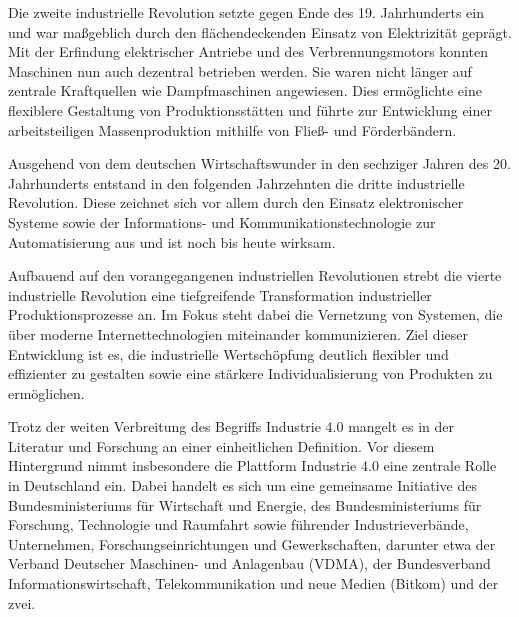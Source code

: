 Die zweite industrielle Revolution setzte gegen Ende des 19. Jahrhunderts ein und war maßgeblich durch den flächendeckenden Einsatz von Elektrizität geprägt. 
Mit der Erfindung elektrischer Antriebe und des Verbrennungsmotors konnten Maschinen nun auch dezentral betrieben werden. Sie waren nicht länger auf zentrale Kraftquellen wie Dampfmaschinen angewiesen. 
Dies ermöglichte eine flexiblere Gestaltung von Produktionsstätten und führte zur Entwicklung einer arbeitsteiligen Massenproduktion mithilfe von Fließ- und Förderbändern.

Ausgehend von dem deutschen Wirtschaftswunder in den sechziger Jahren des 20. Jahrhunderts entstand in den folgenden Jahrzehnten die dritte industrielle Revolution.
Diese zeichnet sich vor allem durch den Einsatz elektronischer Systeme sowie der Informations- und Kommunikationstechnologie zur Automatisierung aus und ist noch bis heute wirksam.

Aufbauend auf den vorangegangenen industriellen Revolutionen strebt die vierte industrielle Revolution eine tiefgreifende Transformation industrieller Produktionsprozesse an. 
Im Fokus steht dabei die Vernetzung von Systemen, die über moderne Internettechnologien miteinander kommunizieren.
Ziel dieser Entwicklung ist es, die industrielle Wertschöpfung deutlich flexibler und effizienter zu gestalten sowie eine stärkere Individualisierung von Produkten zu ermöglichen. 
\cite{Industrie4.0ProduktionAutomatisierung}\cite{EinführungundUmsetzungI4.0}

Trotz der weiten Verbreitung des Begriffs Industrie 4.0 mangelt es in der Literatur und Forschung an einer einheitlichen Definition.
Vor diesem Hintergrund nimmt insbesondere die Plattform Industrie 4.0 \cite{plattform_i40} eine zentrale Rolle in Deutschland ein. 
Dabei handelt es sich um eine gemeinsame Initiative des Bundesministeriums für Wirtschaft und Energie, des Bundesministeriums für Forschung, Technologie und Raumfahrt sowie führender Industrieverbände, Unternehmen, Forschungseinrichtungen und Gewerkschaften, darunter etwa der Verband Deutscher Maschinen- und Anlagenbau (VDMA), der Bundesverband Informationswirtschaft, Telekommunikation und neue Medien (Bitkom) und der \ac{zvei}.

